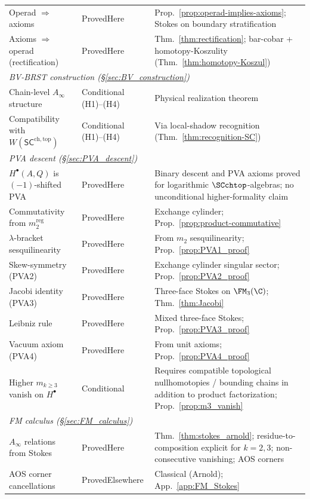 \begin{center}
\begin{tabular}{p{}p{}p{}}
Operad $\Rightarrow$ axioms & ProvedHere & Prop.~\ref{prop:operad-implies-axioms}; Stokes on boundary stratification \\
Axioms $\Rightarrow$ operad (rectification) & ProvedHere & Thm.~\ref{thm:rectification}; bar-cobar + homotopy-Koszulity (Thm.~\ref{thm:homotopy-Koszul}) \\
\hline
\multicolumn{3}{l}{\emph{BV-BRST construction (\S\ref{sec:BV_construction})}} \\
Chain-level $A_\infty$ structure & Conditional (H1)--(H4) & Physical realization theorem \\
Compatibility with $W(\mathsf{SC}^{\mathrm{ch,top}})$ & Conditional (H1)--(H4) & Via local-shadow recognition (Thm.~\ref{thm:recognition-SC}) \\
\hline
\multicolumn{3}{l}{\emph{PVA descent (\S\ref{sec:PVA_descent})}} \\
$H^\bullet(A,Q)$ is $(-1)$-shifted PVA & ProvedHere & Binary descent and PVA axioms proved for logarithmic $\SCchtop$-algebras; no unconditional higher-formality claim \\
Commutativity from $m_2^{\mathrm{reg}}$ & ProvedHere & Exchange cylinder; Prop.~\ref{prop:product-commutative} \\
$\lambda$-bracket sesquilinearity & ProvedHere & From $m_2$ sesquilinearity; Prop.~\ref{prop:PVA1_proof} \\
Skew-symmetry (PVA2) & ProvedHere & Exchange cylinder singular sector; Prop.~\ref{prop:PVA2_proof} \\
Jacobi identity (PVA3) & ProvedHere & Three-face Stokes on $\FM_3(\C)$; Thm.~\ref{thm:Jacobi} \\
Leibniz rule & ProvedHere & Mixed three-face Stokes; Prop.~\ref{prop:PVA3_proof} \\
Vacuum axiom (PVA4) & ProvedHere & From unit axioms; Prop.~\ref{prop:PVA4_proof} \\
Higher $m_{k\geq 3}$ vanish on $H^\bullet$ & Conditional & Requires compatible topological nullhomotopies / bounding chains in addition to product factorization; Prop.~\ref{prop:m3_vanish} \\
\hline
\multicolumn{3}{l}{\emph{FM calculus (\S\ref{sec:FM_calculus})}} \\
$A_\infty$ relations from Stokes & ProvedHere & Thm.~\ref{thm:stokes_arnold}; residue-to-composition explicit for $k=2,3$; non-consecutive vanishing; AOS corners \\
AOS corner cancellations & ProvedElsewhere & Classical (Arnold); App.~\ref{app:FM_Stokes} \\

\end{tabular}
\end{center}
